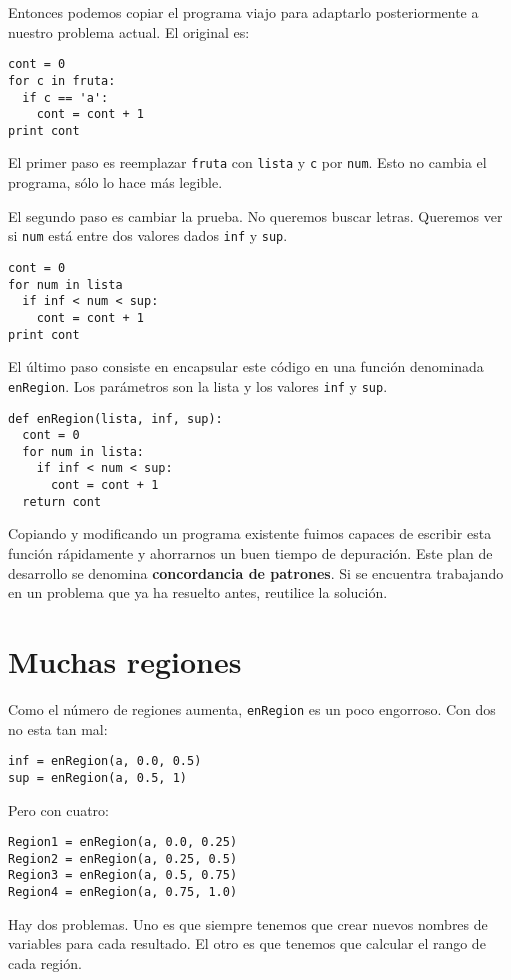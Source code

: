 Entonces podemos copiar el programa viajo para adaptarlo posteriormente
a nuestro problema actual. El original es:

\beforeverb
\begin{verbatim}
cont = 0
for c in fruta:
  if c == 'a':
    cont = cont + 1
print cont
\end{verbatim}
\afterverb
%
El primer paso es reemplazar  \texttt{fruta} con \texttt{lista} y 
\texttt{c} por \texttt{num}.  Esto no cambia el programa, sólo lo hace
más legible.

El segundo paso es cambiar la prueba. No queremos buscar letras.
Queremos ver si  \texttt{num} está entre dos valores dados
\texttt{inf} y  \texttt{sup}.

\beforeverb
\begin{verbatim}
cont = 0
for num in lista
  if inf < num < sup:
    cont = cont + 1
print cont
\end{verbatim}
\afterverb
%
El último paso consiste en  encapsular este código en una
función denominada \texttt{enRegion}.  Los parámetros son la lista
y los valores \texttt{inf} y \texttt{sup}.

\beforeverb
\begin{verbatim}
def enRegion(lista, inf, sup):
  cont = 0
  for num in lista:
    if inf < num < sup:
      cont = cont + 1
  return cont
\end{verbatim}
\afterverb
%
Copiando y modificando un programa existente fuimos capaces
de escribir esta función rápidamente y ahorrarnos un buen
tiempo de depuración. Este plan de desarrollo se denomina
{\bf concordancia de patrones}. Si se encuentra trabajando 
en un problema que ya ha resuelto antes, reutilice la 
solución.

\section{Muchas regiones}

Como el número de regiones aumenta, \texttt{enRegion} es 
un poco engorroso. Con dos no esta tan mal:

\beforeverb
\begin{verbatim}
inf = enRegion(a, 0.0, 0.5)
sup = enRegion(a, 0.5, 1)
\end{verbatim}
\afterverb
%
Pero con cuatro:

\beforeverb
\begin{verbatim}
Region1 = enRegion(a, 0.0, 0.25)
Region2 = enRegion(a, 0.25, 0.5)
Region3 = enRegion(a, 0.5, 0.75)
Region4 = enRegion(a, 0.75, 1.0)
\end{verbatim}
\afterverb
%
Hay dos problemas. Uno es que siempre tenemos que crear
nuevos nombres de variables para cada resultado. El otro
es que tenemos que calcular el rango de cada región.

